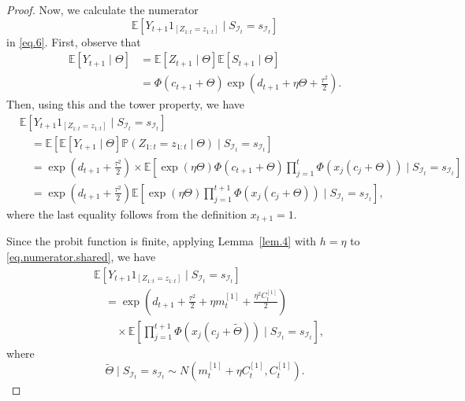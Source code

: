 \documentclass[11pt,authoryear]{elsarticle}
\def\Real{\mathbb{R}}
\def\P#1{{\mathbb{P}}\left(#1\right)}
\def\E#1{{\mathbb E}\left[#1\right]}
\theoremstyle{nopunct}
\numberwithin{equation}{section}
\begin{document}
\begin{proof}
Now, we calculate the numerator
\[
\E{
Y_{t+1}1_{\left[Z_{1:t}=z_{1:t}\right]}
\mid
S_{\mathcal I_t}=s_{\mathcal I_t}
}
\]
in \eqref{eq.6}.
First, observe that
\[
\begin{aligned}
\E{Y_{t+1}\mid\Theta}
&=
\E{Z_{t+1}\mid\Theta}
\E{S_{t+1}\mid\Theta}\\
&=
\Phi(c_{t+1}+\Theta)
\exp\left(
d_{t+1}
+
\eta\Theta
+
\frac{\tau^2}{2}
\right).
\end{aligned}
\]
Then, using this and the tower property, we have
\begin{equation}\label{eq.numerator.shared}
\begin{aligned}
&\E{
Y_{t+1}1_{\left[Z_{1:t}=z_{1:t}\right]}
\mid
S_{\mathcal I_t}=s_{\mathcal I_t}
}\\
&\quad=
\E{
\E{Y_{t+1}\mid\Theta}
\P{Z_{1:t}=z_{1:t}\mid\Theta}
\mid
S_{\mathcal I_t}=s_{\mathcal I_t}
}\\
&\quad=
\exp\left(
d_{t+1}
+
\frac{\tau^2}{2}
\right)\times
\E{
\exp(\eta\Theta)
\Phi(c_{t+1}+\Theta)
\prod_{j=1}^t
\Phi\left(
x_j(c_j+\Theta)
\right)
\mid
S_{\mathcal I_t}=s_{\mathcal I_t}
}\\
&\quad=
\exp\left(
d_{t+1}
+
\frac{\tau^2}{2}
\right)
\E{
\exp(\eta\Theta)
\prod_{j=1}^{t+1}
\Phi\left(
x_j(c_j+\Theta)
\right)
\mid
S_{\mathcal I_t}=s_{\mathcal I_t}
},
\end{aligned}
\end{equation}
where the last equality follows from the definition \(x_{t+1}=1\).

Since the probit function is finite, applying Lemma~\ref{lem.4} with \(h=\eta\) to
\eqref{eq.numerator.shared}, we have
\begin{equation}\label{eq.7}
\begin{aligned}
&\E{
Y_{t+1}1_{\left[Z_{1:t}=z_{1:t}\right]}
\mid
S_{\mathcal I_t}=s_{\mathcal I_t}
}\\
&\quad=
\exp\left(
d_{t+1}
+
\frac{\tau^2}{2}
+
\eta m_t^{[1]}
+
\frac{\eta^2C_t^{[1]}}{2}
\right)\\
&\qquad\times
\E{
\prod_{j=1}^{t+1}
\Phi\left(
x_j(c_j+\widetilde{\Theta})
\right)
\mid
S_{\mathcal I_t}=s_{\mathcal I_t}
},
\end{aligned}
\end{equation}
where
\[
\widetilde{\Theta}
\mid
S_{\mathcal I_t}=s_{\mathcal I_t}
\sim
N(m_t^{[1]}+\eta C_t^{[1]},C_t^{[1]}).
\]


\end{proof}
\end{document}
